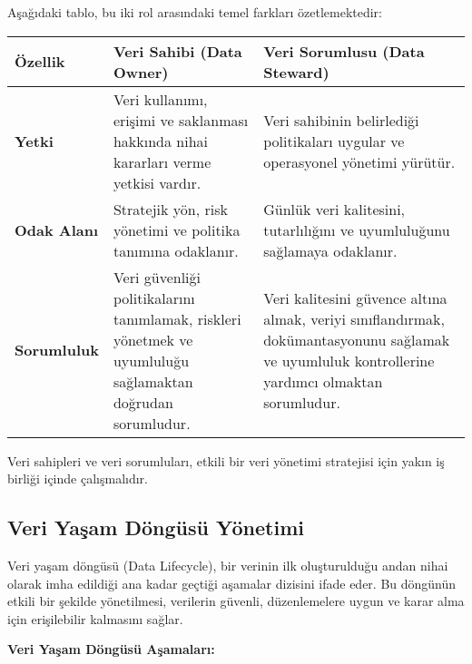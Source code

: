 Aşağıdaki tablo, bu iki rol arasındaki temel farkları özetlemektedir:

\begin{tabularx}{\textwidth}{|l|X|X|}
\hline
\textbf{Özellik} & \textbf{Veri Sahibi (Data Owner)} & \textbf{Veri Sorumlusu (Data Steward)} \\
\hline
\textbf{Yetki} & Veri kullanımı, erişimi ve saklanması hakkında nihai kararları verme yetkisi vardır. & Veri sahibinin belirlediği politikaları uygular ve operasyonel yönetimi yürütür. \\
\hline
\textbf{Odak Alanı} & Stratejik yön, risk yönetimi ve politika tanımına odaklanır. & Günlük veri kalitesini, tutarlılığını ve uyumluluğunu sağlamaya odaklanır. \\
\hline
\textbf{Sorumluluk} & Veri güvenliği politikalarını tanımlamak, riskleri yönetmek ve uyumluluğu sağlamaktan doğrudan sorumludur. & Veri kalitesini güvence altına almak, veriyi sınıflandırmak, dokümantasyonunu sağlamak ve uyumluluk kontrollerine yardımcı olmaktan sorumludur. \\
\hline
\end{tabularx}

Veri sahipleri ve veri sorumluları, etkili bir veri yönetimi stratejisi için yakın iş birliği içinde çalışmalıdır.

\subsection{Veri Yaşam Döngüsü Yönetimi}

Veri yaşam döngüsü (Data Lifecycle), bir verinin ilk oluşturulduğu andan nihai olarak imha edildiği ana kadar geçtiği aşamalar dizisini ifade eder. Bu döngünün etkili bir şekilde yönetilmesi, verilerin güvenli, düzenlemelere uygun ve karar alma için erişilebilir kalmasını sağlar.

\textbf{Veri Yaşam Döngüsü Aşamaları:}

